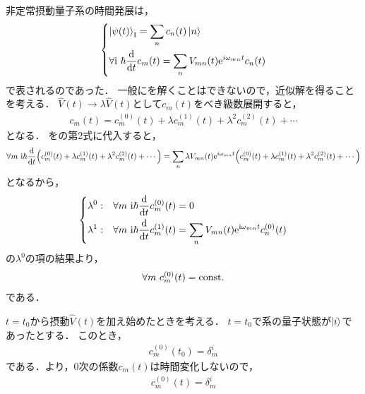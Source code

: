 \documentclass{report}
\begin{document}
  非定常摂動量子系の時間発展は，
  \begin{align}
    \begin{dcases}
      \ket{\psi(t)}_{\mathrm{I}} = \sum_{n}c_n(t)\ket{n} \label{non-steady-quantum-system-re} \\
      \forall \mathrm{i}\ \hbar\dv{t}c_m(t) = \sum_{n}V_{mn}(t)\mathrm{e}^{i\omega_{mn}t}c_n(t)
    \end{dcases}
  \end{align}
  で表されるのであった．
  一般にを解くことはできないので，近似解を得ることを考える．
  $\hat{V}(t) \to \lambda\hat{V}(t)$として$c_m(t)$をべき級数展開すると，
  \begin{align}
    c_m(t) = c_m^{(0)}(t) + \lambda c_m^{(1)}(t) + \lambda^2c_m^{(2)}(t) + \cdots\label{cnt-taylor-expantion}
  \end{align}
  となる．
  をの第2式に代入すると，
  \begin{align}
    \forall m\  \mathrm{i}\hbar\dv{t}\qty(c_m^{(0)}(t) + \lambda c_m^{(1)}(t) + \lambda^2c_m^{(2)}(t) + \cdots) = \sum_{n}\lambda V_{mn}(t)\mathrm{e}^{i\omega_{mn}t}\qty(c_m^{(0)}(t) + \lambda c_m^{(1)}(t) + \lambda^2c_m^{(2)}(t) + \cdots)
  \end{align}
  となるから，
  \begin{align}
    \begin{dcases}
      \lambda^0 :& \forall m\ \mathrm{i}\hbar\dv{t}c_m^{(0)}(t) = 0 \label{non-steady-quantum-system-re-expantion} \\ 
      \lambda^1 :& \forall m\ \mathrm{i}\hbar\dv{t}c_m^{(1)}(t) = \sum_{n}V_{mn}(t)\mathrm{e}^{\mathrm{i}\omega_{mn}t}c_n^{(0)}(t)
    \end{dcases}
  \end{align}
  の$\lambda^0$の項の結果より，
  \begin{align}
    \forall m\ c_m^{(0)}(t) = \mathrm{const.}\label{non-steady-quantum-system-re-const}
  \end{align}
  である．
  \par
  $t = t_0$から摂動$\hat{V}(t)$を加え始めたときを考える．
  $t = t_0$で系の量子状態が$\ket{i}$であったとする．
  このとき，
  \begin{align}
    c_m^{(0)}(t_0) = \delta_m^i
  \end{align}
  である．より，0次の係数$c_m(t)$は時間変化しないので，
  \begin{align}
    c_m^{(0)}(t) = \delta_m^i
  \end{align}
\end{document}

